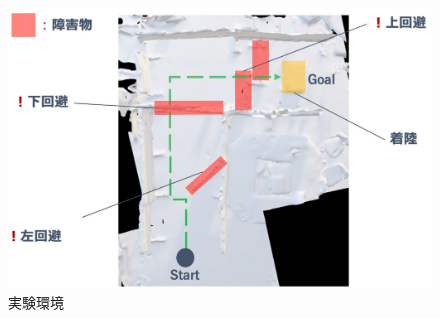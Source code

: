 \documentclass[submit,techrep]{ipsj}
\begin{document}
\begin{figure}[tb]
\centering
\includegraphics[width=\linewidth]{img/04_experiment.eps}
\caption{実験環境}
\label{fig:04_experiment}
\end{figure}









\end{document}

